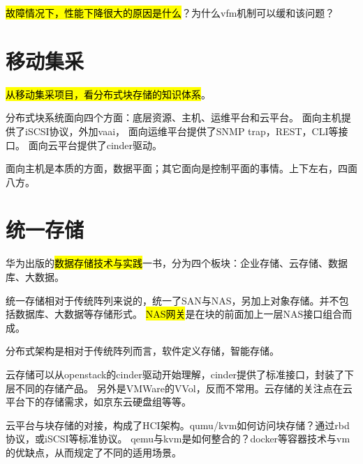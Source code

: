 \hl{故障情况下，性能下降很大的原因是什么}？为什么vfm机制可以缓和该问题？

\section{移动集采}

\hl{从移动集采项目，看分布式块存储的知识体系}。

分布式块系统面向四个方面：底层资源、主机、运维平台和云平台。
面向主机提供了iSCSI协议，外加vaai，
面向运维平台提供了SNMP trap，REST，CLI等接口。
面向云平台提供了cinder驱动。

面向主机是本质的方面，数据平面；其它面向是控制平面的事情。上下左右，四面八方。

\section{统一存储}

华为出版的\hl{数据存储技术与实践}一书，分为四个板块：企业存储、云存储、数据库、大数据。

统一存储相对于传统阵列来说的，统一了SAN与NAS，另加上对象存储。并不包括数据库、大数据等存储形式。
\hl{NAS网关}是在块的前面加上一层NAS接口组合而成。

分布式架构是相对于传统阵列而言，软件定义存储，智能存储。

云存储可以从openstack的cinder驱动开始理解，cinder提供了标准接口，封装了下层不同的存储产品。
另外是VMWare的VVol，反而不常用。云存储的关注点在云平台下的存储需求，如京东云硬盘组等等。

云平台与块存储的对接，构成了HCI架构。qumu/kvm如何访问块存储？通过rbd协议，或iSCSI等标准协议。
qemu与kvm是如何整合的？docker等容器技术与vm的优缺点，从而规定了不同的适用场景。
